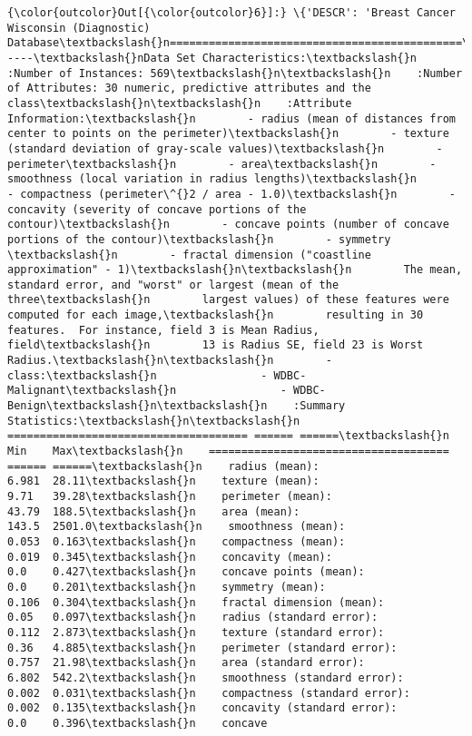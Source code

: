 \documentclass[11pt]{article}
\begin{document}
\begin{Verbatim}[commandchars=\\\{\}]
{\color{outcolor}Out[{\color{outcolor}6}]:} \{'DESCR': 'Breast Cancer Wisconsin (Diagnostic) Database\textbackslash{}n=============================================\textbackslash{}n\textbackslash{}nNotes\textbackslash{}n-----\textbackslash{}nData Set Characteristics:\textbackslash{}n    :Number of Instances: 569\textbackslash{}n\textbackslash{}n    :Number of Attributes: 30 numeric, predictive attributes and the class\textbackslash{}n\textbackslash{}n    :Attribute Information:\textbackslash{}n        - radius (mean of distances from center to points on the perimeter)\textbackslash{}n        - texture (standard deviation of gray-scale values)\textbackslash{}n        - perimeter\textbackslash{}n        - area\textbackslash{}n        - smoothness (local variation in radius lengths)\textbackslash{}n        - compactness (perimeter\^{}2 / area - 1.0)\textbackslash{}n        - concavity (severity of concave portions of the contour)\textbackslash{}n        - concave points (number of concave portions of the contour)\textbackslash{}n        - symmetry \textbackslash{}n        - fractal dimension ("coastline approximation" - 1)\textbackslash{}n\textbackslash{}n        The mean, standard error, and "worst" or largest (mean of the three\textbackslash{}n        largest values) of these features were computed for each image,\textbackslash{}n        resulting in 30 features.  For instance, field 3 is Mean Radius, field\textbackslash{}n        13 is Radius SE, field 23 is Worst Radius.\textbackslash{}n\textbackslash{}n        - class:\textbackslash{}n                - WDBC-Malignant\textbackslash{}n                - WDBC-Benign\textbackslash{}n\textbackslash{}n    :Summary Statistics:\textbackslash{}n\textbackslash{}n    ===================================== ====== ======\textbackslash{}n                                           Min    Max\textbackslash{}n    ===================================== ====== ======\textbackslash{}n    radius (mean):                        6.981  28.11\textbackslash{}n    texture (mean):                       9.71   39.28\textbackslash{}n    perimeter (mean):                     43.79  188.5\textbackslash{}n    area (mean):                          143.5  2501.0\textbackslash{}n    smoothness (mean):                    0.053  0.163\textbackslash{}n    compactness (mean):                   0.019  0.345\textbackslash{}n    concavity (mean):                     0.0    0.427\textbackslash{}n    concave points (mean):                0.0    0.201\textbackslash{}n    symmetry (mean):                      0.106  0.304\textbackslash{}n    fractal dimension (mean):             0.05   0.097\textbackslash{}n    radius (standard error):              0.112  2.873\textbackslash{}n    texture (standard error):             0.36   4.885\textbackslash{}n    perimeter (standard error):           0.757  21.98\textbackslash{}n    area (standard error):                6.802  542.2\textbackslash{}n    smoothness (standard error):          0.002  0.031\textbackslash{}n    compactness (standard error):         0.002  0.135\textbackslash{}n    concavity (standard error):           0.0    0.396\textbackslash{}n    concave 
\end{Verbatim}
\end{document}
